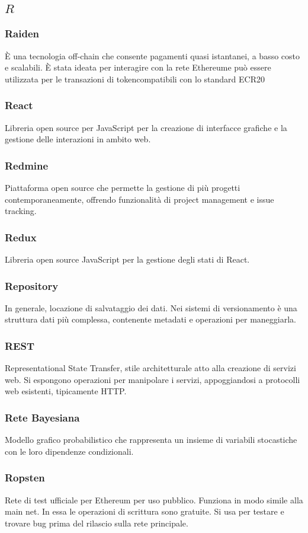 \subsection*{\quad$R\quad$}
\subsubsection*{Raiden}
È una tecnologia off-chain che consente pagamenti quasi istantanei, a basso costo e scalabili. È stata ideata per interagire con la rete Ethereum\glosp e può essere utilizzata per le transazioni di token\glosp compatibili con lo standard ECR20\glo

\subsubsection*{React}
Libreria open source per JavaScript per la creazione di interfacce grafiche e la gestione delle interazioni in ambito web.

\subsubsection*{Redmine}
Piattaforma open source che permette la gestione di più progetti contemporaneamente, offrendo funzionalità di project management e issue tracking.

\subsubsection*{Redux}
Libreria open source JavaScript per la gestione degli stati di React\glo.

\subsubsection*{Repository}
In generale, locazione di salvataggio dei dati. Nei sistemi di versionamento è una struttura dati più complessa, contenente metadati e operazioni per maneggiarla.

\subsubsection*{REST}
Representational State Transfer, stile architetturale atto alla creazione di servizi web. Si espongono operazioni per manipolare i servizi, appoggiandosi a protocolli web esistenti, tipicamente HTTP.

\subsubsection*{Rete Bayesiana}
Modello grafico probabilistico che rappresenta un insieme di variabili stocastiche con le loro dipendenze condizionali.

\subsubsection*{Ropsten}
Rete di test ufficiale per Ethereum per uso pubblico. Funziona in modo simile alla main net. In essa le operazioni di scrittura sono gratuite. Si usa per testare e trovare bug prima del rilascio sulla rete principale.

